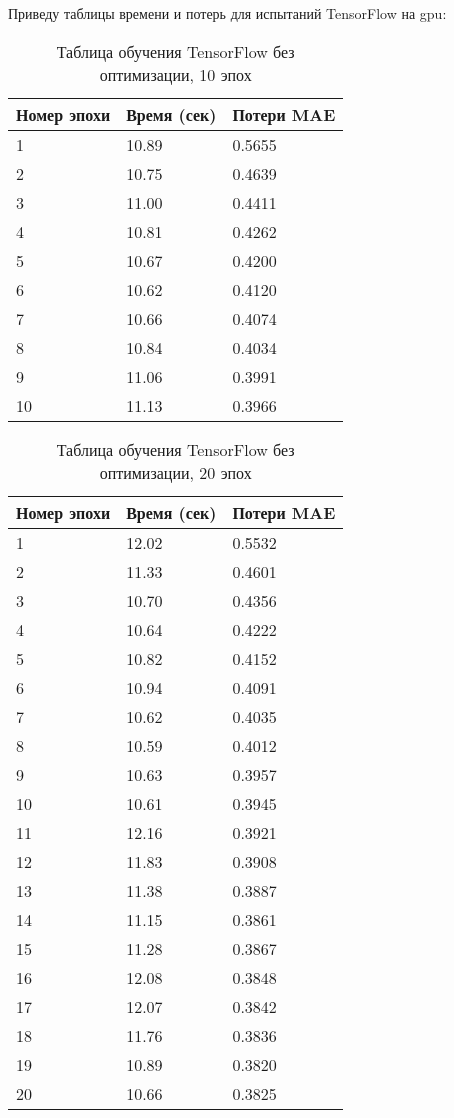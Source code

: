 \documentclass[a4paper,12pt,titlepage,final]{article}
\begin{document}
Приведу таблицы времени и потерь для испытаний TensorFlow на gpu:

\begin{table}[H]
\centering
\begin{tabular}{|p{5.4cm}|p{3.8cm}|p{3.8cm}|}
\hline
Номер эпохи & Время (сек) & Потери MAE \\
\hline
1 & 10.89 & 0.5655 \\ [1.5ex]
\hline
2 & 10.75 & 0.4639 \\ [1.5ex]
\hline
3 & 11.00 & 0.4411 \\ [1.5ex]
\hline
4 & 10.81 & 0.4262 \\ [1.5ex]
\hline
5 & 10.67 & 0.4200 \\ [1.5ex]
\hline
6 & 10.62 & 0.4120 \\ [1.5ex]
\hline
7 & 10.66 & 0.4074 \\ [1.5ex]
\hline
8 & 10.84 & 0.4034 \\ [1.5ex]
\hline
9 & 11.06 & 0.3991 \\ [1.5ex]
\hline
10 & 11.13 & 0.3966 \\ [1.5ex]
\hline
\end{tabular}
\caption{Таблица обучения TensorFlow без оптимизации, 10 эпох}
\label{gputable1}
\end{table}

\begin{table}[H]
\centering
\begin{tabular}{|p{6.4cm}|p{3.2cm}|p{3.2cm}|}
\hline
Номер эпохи & Время (сек) & Потери MAE \\
\hline
1 & 12.02 & 0.5532 \\ [1.5ex]
\hline
2 & 11.33 & 0.4601 \\ [1.5ex]
\hline
3 & 10.70 & 0.4356 \\ [1.5ex]
\hline
4 & 10.64 & 0.4222 \\ [1.5ex]
\hline
5 & 10.82 & 0.4152 \\ [1.5ex]
\hline
6 & 10.94 & 0.4091 \\ [1.5ex]
\hline
7 & 10.62 & 0.4035 \\ [1.5ex]
\hline
8 & 10.59 & 0.4012 \\ [1.5ex]
\hline
9 & 10.63 & 0.3957 \\ [1.5ex]
\hline
10 & 10.61 & 0.3945 \\ [1.5ex]
\hline
11 & 12.16 & 0.3921 \\ [1.5ex]
\hline
12 & 11.83 & 0.3908 \\ [1.5ex]
\hline
13 & 11.38 & 0.3887 \\ [1.5ex]
\hline
14 & 11.15 & 0.3861 \\ [1.5ex]
\hline
15 & 11.28 & 0.3867 \\ [1.5ex]
\hline
16 & 12.08 & 0.3848 \\ [1.5ex]
\hline
17 & 12.07 & 0.3842 \\ [1.5ex]
\hline
18 & 11.76 & 0.3836 \\ [1.5ex]
\hline
19 & 10.89 & 0.3820 \\ [1.5ex]
\hline
20 & 10.66 & 0.3825 \\ [1.5ex]
\hline
\end{tabular}
\caption{Таблица обучения TensorFlow без оптимизации, 20 эпох}
\label{gputable2}
\end{table}
\end{document}
